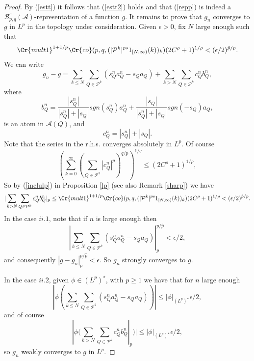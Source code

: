 \documentclass{amsart}
\theoremstyle{definition}
\newcommand{\SP}{{\mathcal P}}
\newcommand{\Crr}[1]{\Cr{#1}}
\begin{document}
\begin{proof}By (\ref{estt}) it follows that (\ref{estt2}) holds and that (\ref{repp}) is indeed a $\mathcal{B}^s_{p,q}(\mathcal{A})$-representation of a function $g$. It remains to prove that $g_n$ converges to $g$ in $L^p$ in the topology under consideration. Given $\epsilon > 0$,  fix  $N$ large enough such that 
$$\Crr{mult1}^{1+1/p}  \Crr{co}(p,q, ( |\mathcal{P}^k|^{ps}1_{[N,\infty)}(k) )_k )   (2C^\rho+1)^{1/\rho}< (\epsilon/2)^{\hat{p}/p}.$$
We can write
$$g_n-g= \sum_{k\leq N} \sum_{Q\in \SP^k} (s_Q^na_Q^n - s_Qa_Q) + \sum_{k> N} \sum_{Q\in \SP^k}  c_Q^n b_Q^n,$$
where
$$b_Q^n =   \frac{|s_Q^n|}{|s_Q^n| + |s_Q|} sgn(s_Q^n) a_Q^n     +  \frac{|s_Q|}{|s_Q^n| + |s_Q|}  sgn(-s_Q) a_Q,$$
is an atom in $\mathcal{A}(Q)$, and 
$$c_Q^n = |s_Q^n| + |s_Q|.$$
Note that  the series in the r.h.s. converges absolutely  in $L^p$. Of course
$$ (\sum_{k=0}^{\infty}(\sum_{Q\in \SP^k}|c_Q^n|^p)^{q/p})^{1/q}\leq (2C^\rho+1)^{1/\rho},$$
So by (\ref{inclulp})  in Proposition \ref{lp} (see also Remark \ref{sharp}) we have 
$$
|\sum_{k> N} \sum_{Q \in \mathcal{P}^k}   c_Q^n b_Q^n|_p\leq \Crr{mult1}^{1+1/p}  \Crr{co}(p,q, ( |\mathcal{P}^k|^{ps}1_{[N,\infty)}(k) )_k )   (2C^\rho+1)^{1/\rho}  < (\epsilon/2)^{\hat{p}/p}. 
$$
In the case $ii.1$, note that if $n$  is large enough  then 
$$| \sum_{k\leq N} \sum_{Q\in \SP^k} (s_Q^na_Q^n - s_Qa_Q)|_p^{p/\hat{p}}< \epsilon/2,$$
and consequently $|g-g_n|_p^{p/\hat{p}} < \epsilon$.  So $g_n$ strongly converges to $g$. 

\noindent In the case $ii.2$, given $\phi\in (L^p)^\star$, with $p\geq 1$ we have that for $n$  large enough
$$|\phi(\sum_{k\leq N} \sum_{Q\in \SP^k} (s_Q^na_Q^n - s_Qa_Q))|\leq |\phi|_{(L^p)^\star} \epsilon/2,$$
and of course
$$
|\phi(\sum_{k> N} \sum_{Q \in \mathcal{P}^k}   c_Q^n b_Q^n|_p)| \leq  |\phi|_{(L^p)^\star}  \epsilon/2,
$$
so $g_n$ weakly converges to $g$ in $L^p$. 
\end{proof}
\end{document}
